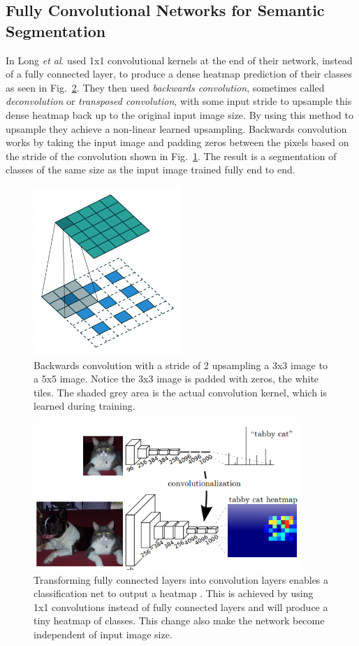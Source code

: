 \subsection{Fully Convolutional Networks for Semantic Segmentation}
In \cite{long2015fully} Long \textit{et al}. used 1x1 convolutional kernels at the end of their network, instead of a fully connected layer, to produce a dense heatmap prediction of their classes as seen in Fig.~\ref{f:fcn1}. They then used \textit{backwards convolution}, sometimes called \textit{deconvolution} or \textit{transposed convolution}, with some input stride to upsample this dense heatmap back up to the original input image size. By using this method to upsample they achieve a non-linear learned upsampling. Backwards convolution works by taking the input image and padding zeros between the pixels based on the stride of the convolution shown in Fig.~\ref{f:deconv}. The result is a segmentation of classes of the same size as the input image trained fully end to end. 
\begin{figure}[h!]
	\centering
		\includegraphics[width=0.50\textwidth]{figures/padding_strides_transposed.png}
	\caption{Backwards convolution with a stride of 2 upsampling a 3x3 image to a 5x5 image. Notice the 3x3 image is padded with zeros, the white tiles. The shaded grey area is the actual convolution kernel, which is learned during training.}
	\label{f:deconv}
\end{figure}
\begin{figure}[h!]
	\centering
		\includegraphics[width=0.90\textwidth]{figures/fcn1.png}
	\caption{Transforming fully connected layers into convolution layers enables a classification net to output a heatmap \cite{long2015fully}. This is achieved by using 1x1 convolutions instead of fully connected layers and will produce a tiny heatmap of classes. This change also make the network become independent of input image size.}
	\label{f:fcn1}
\end{figure}
